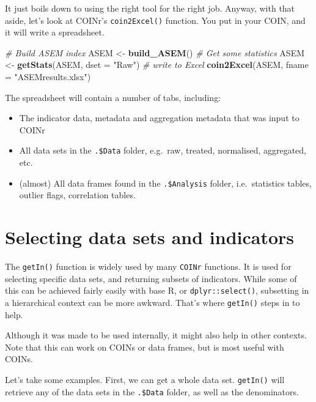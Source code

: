 \documentclass[
]{book}
\newenvironment{Shaded}{\begin{snugshade}}{\end{snugshade}}
\newcommand{\CommentTok}[1]{\textcolor[rgb]{0.56,0.35,0.01}{\textit{#1}}}
\newcommand{\DataTypeTok}[1]{\textcolor[rgb]{0.13,0.29,0.53}{#1}}
\newcommand{\KeywordTok}[1]{\textcolor[rgb]{0.13,0.29,0.53}{\textbf{#1}}}
\newcommand{\NormalTok}[1]{#1}
\newcommand{\StringTok}[1]{\textcolor[rgb]{0.31,0.60,0.02}{#1}}
\providecommand{\tightlist}{%
  \setlength{\itemsep}{0pt}\setlength{\parskip}{0pt}}
\begin{document}
It just boils down to using the right tool for the right job. Anyway, with that aside, let's look at COINr's \texttt{coin2Excel()} function. You put in your COIN, and it will write a spreadsheet.

\begin{Shaded}
\begin{Highlighting}[]
\CommentTok{# Build ASEM index}
\NormalTok{ASEM <-}\StringTok{ }\KeywordTok{build_ASEM}\NormalTok{()}
\CommentTok{# Get some statistics}
\NormalTok{ASEM <-}\StringTok{ }\KeywordTok{getStats}\NormalTok{(ASEM, }\DataTypeTok{dset =} \StringTok{"Raw"}\NormalTok{)}
\CommentTok{# write to Excel}
\KeywordTok{coin2Excel}\NormalTok{(ASEM, }\DataTypeTok{fname =} \StringTok{"ASEMresults.xlsx"}\NormalTok{)}
\end{Highlighting}
\end{Shaded}

The spreadsheet will contain a number of tabs, including:

\begin{itemize}
\tightlist
\item
  The indicator data, metadata and aggregation metadata that was input to COINr
\item
  All data sets in the \texttt{.\$Data} folder, e.g.~raw, treated, normalised, aggregated, etc.
\item
  (almost) All data frames found in the \texttt{.\$Analysis} folder, i.e.~statistics tables, outlier flags, correlation tables.
\end{itemize}

\hypertarget{selecting-data-sets-and-indicators}{%
\section{Selecting data sets and indicators}\label{selecting-data-sets-and-indicators}}

The \texttt{getIn()} function is widely used by many \texttt{COINr} functions. It is used for selecting specific data sets, and returning subsets of indicators. While some of this can be achieved fairly easily with base R, or \texttt{dplyr::select()}, subsetting in a hierarchical context can be more awkward. That's where \texttt{getIn()} steps in to help.

Although it was made to be used internally, it might also help in other contexts. Note that this can work on COINs or data frames, but is most useful with COINs.

Let's take some examples. First, we can get a whole data set. \texttt{getIn()} will retrieve any of the data sets in the \texttt{.\$Data} folder, as well as the denominators.
\end{document}
